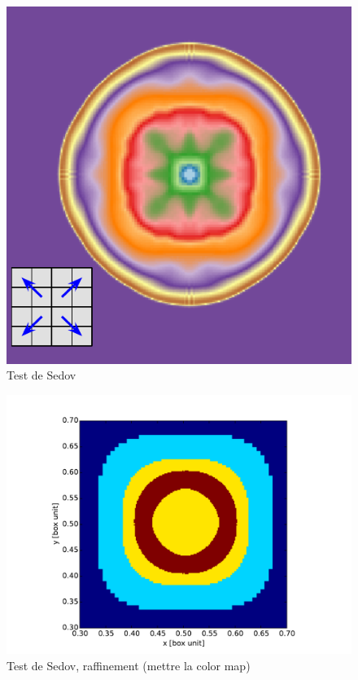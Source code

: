 \begin{figure}[bth]
		\includegraphics[width=.95\linewidth]{img/03/sedov/slice_kin.pdf} 
        \caption{Test de Sedov}
 		\label{fig:}
\end{figure}

\begin{figure}[bth]
        \includegraphics[width=.95\linewidth]{img/03/sedov/slice_th_1raf.pdf} 
        \caption{Test de Sedov, raffinement (mettre la color map) }
 		\label{fig:}
\end{figure}

